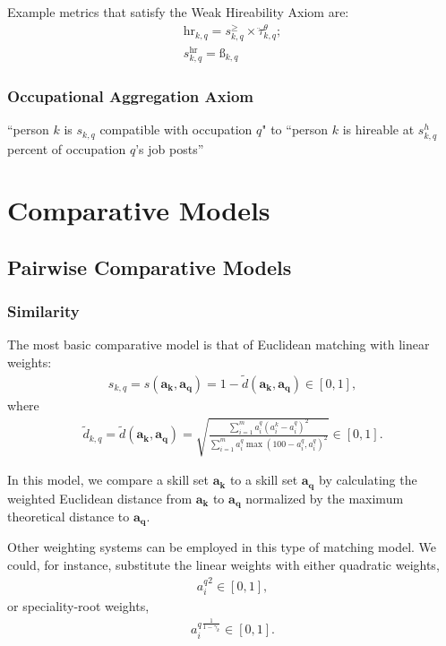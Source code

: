 \documentclass{elsarticle} %
\begin{document}
Example metrics that satisfy the Weak Hireability Axiom are:
\begin{gather}
    \text{hr}_{k,q} =
    s_{k,q}^{\geq} \times
    \ddot{\tau}_{k,q}^{\theta};\\
    s_{k,q}^{\text{hr}} = \textit{\ss}_{k,q}
\end{gather}

\subsubsection{Occupational Aggregation Axiom}
``person $k$ is $s_{k,q}$ compatible with occupation $q$" to ``person $k$ is hireable at $s_{k,q}^{h}$ percent of occupation $q$'s job posts''


\section{Comparative Models}
\subsection{Pairwise Comparative Models}
\subsubsection{Similarity}
The most basic comparative model is that of Euclidean matching with linear
weights:
\begin{gather}
    s_{k,q} =
    s(\boldsymbol{a_k}, \boldsymbol{a_q}) =
    1 - \tilde{d}(\boldsymbol{a_k}, \boldsymbol{a_q})
    \in [0,1]
    ,
\end{gather}
where
\begin{gather}
    \tilde{d}_{k,q} =
    \tilde{d}(\boldsymbol{a_k}, \boldsymbol{a_q}) =
    \sqrt{
    \frac{
    \sum_{i = 1}^{m}{
    a_{i}^{q} (a_{i}^{k} - a_{i}^{q})^2
    }
    }{
    \sum_{i = 1}^{m}{
    a_{i}^{q} \max(100 - a_{i}^{q}, a_{i}^{q})^2
    }
    }
    }
    \in [0,1]
    .
\end{gather}

In this model, we compare a skill set $\boldsymbol{a_k}$ to a skill set
$\boldsymbol{a_q}$ by calculating the weighted Euclidean distance from
$\boldsymbol{a_k}$ to $\boldsymbol{a_q}$ normalized by the maximum theoretical
distance to $\boldsymbol{a_q}$.

Other weighting systems can be employed in this type of matching model. We
could, for instance, substitute the linear weights with either quadratic
weights,
\begin{gather}
    {a_{i}^{q}} ^ 2
    \in [0,1]
    ,
\end{gather}
or speciality-root weights,
\begin{gather}
    {a_{i}^{q}} ^ {
        \frac{1}{1 - \gamma_k}
    }
    \in [0,1]
    .
\end{gather}
\end{document}
